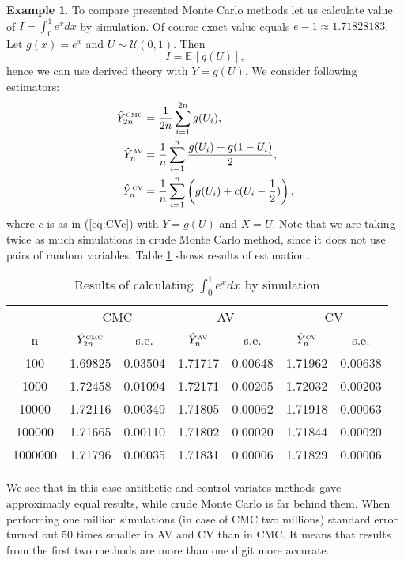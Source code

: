 \documentclass[a4paper,12pt, oneside]{book}
\theoremstyle{definition}
\newtheorem{example}{Example}[section]
\theoremstyle{remark}
\def\E{{\mathbb{E}}\,}
\def\CMC[#1]{\hat{Y}^{\hbox{\tiny CMC}}_{#1}}
\def\AV[#1]{\hat{Y}^{\hbox{\tiny AV}}_{#1}}
\def\CV[#1]{\hat{Y}^{\hbox{\tiny CV}}_{#1}}
\begin{document}
\begin{example}
To compare presented Monte Carlo methods let us calculate value of $I = \int_0^1 e^x dx$ by simulation. Of course exact value equals $e - 1 \approx 1.71828183$. Let $g(x) = e^x$ and $U \sim \mathcal{U}(0,1)$. Then 
\[ I = \E[g(U)], \]
 hence we can use derived theory with $Y = g(U)$. We consider following estimators:
 \begin{equation*}
  \begin{split}
   \CMC[2n] &= \frac{1}{2n} \sum\limits_{i=1}^{2n} g(U_i), \\
   \AV[n] &= \frac{1}{n} \sum\limits_{i=1}^{n} \frac{g(U_i) + g(1-U_i)}{2}, \\ 
   \CV[n] &= \frac{1}{n} \sum\limits_{i=1}^{n} \left( g(U_i) + c(U_i - \frac{1}{2}) \right),
  \end{split}
 \end{equation*}
where $c$ is as in (\ref{eq:CVc}) with $Y = g(U)$ and $X = U$. Note that we are taking twice as much simulations in crude Monte Carlo method, since it does not use pairs of random variables. Table \ref{tab:MCcompare} shows results of estimation.

\begin{table}[h]
\centering
 \caption{Results of calculating $\int_0^1 e^x dx$ by simulation}
 \label{tab:MCcompare}
\begin{tabular} {||c | c | c | c | c |c | c ||}  
 \hline 
  & \multicolumn{2}{|c|}{ CMC } & \multicolumn{2}{|c|}{ AV } & \multicolumn{2}{|c|}{ CV } \\
  n & \multicolumn{1}{c}{ $\CMC[2n]$ } & \multicolumn{1}{c|}{ s.e. } & \multicolumn{1}{c}{ $\AV[n]$ } & \multicolumn{1}{c|}{ s.e. } & \multicolumn{1}{c}{ $\CV[n]$ } & \multicolumn{1}{c|}{ s.e. } \\ \hline \hline 
100    & 1.69825 & 0.03504 & 1.71717 & 0.00648 & 1.71962 & 0.00638 \\ \hline 
1000   & 1.72458 & 0.01094 & 1.72171 & 0.00205 & 1.72032 & 0.00203 \\ \hline 
10000  & 1.72116 & 0.00349 & 1.71805 & 0.00062 & 1.71918 & 0.00063 \\ \hline 
100000 & 1.71665 & 0.00110 & 1.71802 & 0.00020 & 1.71844 & 0.00020 \\ \hline 
1000000& 1.71796 & 0.00035 & 1.71831 & 0.00006 & 1.71829 & 0.00006 \\ \hline 
\end{tabular}  
\end{table}
We see that in this case antithetic and control variates methods gave approximatly equal results, while crude Monte Carlo is far behind them. When performing one million simulations (in case of CMC two millions) standard error turned out 50 times smaller in AV and CV than in CMC. It means that results from the first two methods are more than one digit more accurate.


\end{example}
\end{document}
